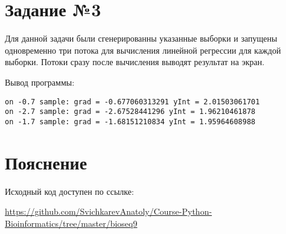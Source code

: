 \documentclass{article} %
\begin{document}
\newpage
\section{Задание №3}
Для данной задачи были сгенерированны указанные выборки и запущены одновременно три потока для вычисления линейной регрессии для каждой выборки. Потоки сразу после вычисления выводят результат на экран.



Вывод программы:
\begin{verbatim}
on -0.7 sample: grad = -0.677060313291 yInt = 2.01503061701
on -2.7 sample: grad = -2.67528441296 yInt = 1.96210461878
on -1.7 sample: grad = -1.68151210834 yInt = 1.95964608988
\end{verbatim}


\section{Пояснение}
Исходный код доступен по ссылке:

\href{https://github.com/SvichkarevAnatoly/Course-Python-Bioinformatics/tree/master/bioseq9}{https://github.com/SvichkarevAnatoly/Course-Python-Bioinformatics/tree/master/bioseq9}
\end{document}
